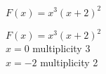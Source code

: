 {$F(x) = x^{3}(x + 2)^{2}$
}
{ $F(x) = x^{3}(x + 2)^{2}$\\
$x = 0$ multiplicity 3\\
$x = -2$ multiplicity 2

\begin{center}
\end{center}}